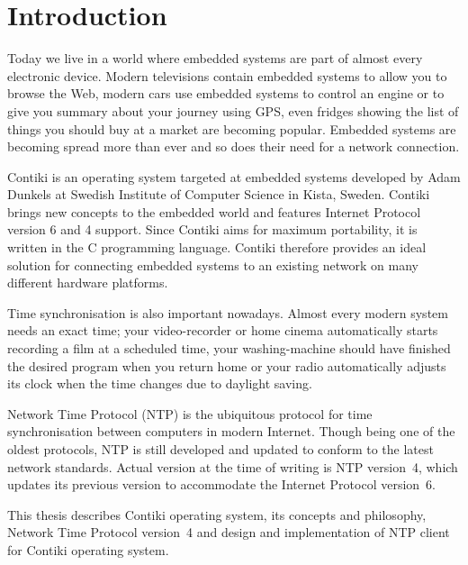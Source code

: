 
\chapter{Introduction}
Today we live in a world where embedded systems are part of almost every electronic device.
Modern televisions contain embedded systems to allow you to browse the Web,
modern cars use embedded systems to control an engine or to give you summary
about your journey using GPS, even fridges showing the list of things you should buy at a market are becoming popular.
Embedded systems are becoming spread more than ever and so does
their need for a network connection.

Contiki is an operating system targeted at embedded systems
developed by Adam Dunkels at Swedish Institute of Computer Science in Kista, Sweden.
Contiki brings new concepts to the embedded world and features
Internet Protocol version 6 and 4 support.
Since Contiki aims for maximum portability, it is written in the C programming language.
Contiki therefore provides an ideal solution for connecting
embedded systems to an existing network on many different hardware platforms.

Time synchronisation is also important nowadays.
Almost every modern system needs an exact time;
your video-recorder or home cinema automatically starts recording a film at a scheduled time,
your washing-machine should have finished the
desired program when you return home or your radio automatically adjusts its clock when the time changes
due to daylight saving.

Network Time Protocol (NTP) is the ubiquitous protocol for time synchronisation between computers in modern Internet.
Though being one of the oldest protocols, NTP is still developed and updated to conform to the latest
network standards. Actual version at the time of writing is NTP version~4, which updates its previous version to
accommodate the Internet Protocol version~6.

This thesis describes Contiki operating system, its concepts and philosophy,
Network Time Protocol version~4 and design and implementation of NTP client for Contiki operating system.










